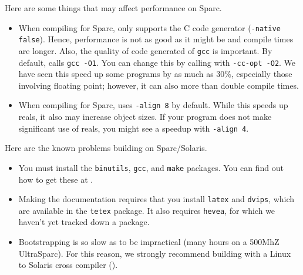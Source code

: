 
Here are some things that may affect performance on Sparc.
\begin{itemize}

\item
When compiling for Sparc, {\mlton} only supports the C code generator
({\tt -native false}).  Hence, performance is not as good as it might
be and compile times are longer.  Also, the quality of code generated
of {\tt gcc} is important.  By default, {\mlton} calls {\tt gcc -O1}.
You can change this by calling {\mlton} with {\tt -cc-opt -O2}.  We
have seen this speed up some programs by as much as 30\%, especially
those involving floating point; however, it can also more than double
compile times.

\item
When compiling for Sparc, {\mlton} uses {\tt -align 8} by default.
While this speeds up reals, it also may increase object sizes.  If
your program does not make significant use of reals, you might see a
speedup with {\tt -align 4}.

\end{itemize}
Here are the known problems building {\mlton} on Sparc/Solaris.

\begin{itemize}

\item You must install the {\tt binutils}, {\tt gcc}, and {\tt make}
packages.  You can find out how to get these at
.

\item Making the documentation requires that you install {\tt latex}
and {\tt dvips}, which are available in the {\tt tetex} package.  It
also requires {\tt hevea}, for which we haven't yet tracked down a
package.

\item Bootstrapping is so slow as to be impractical (many hours on a
500MhZ UltraSparc).  For this reason, we strongly recommend building
with a Linux to Solaris cross compiler ().

\end{itemize}
